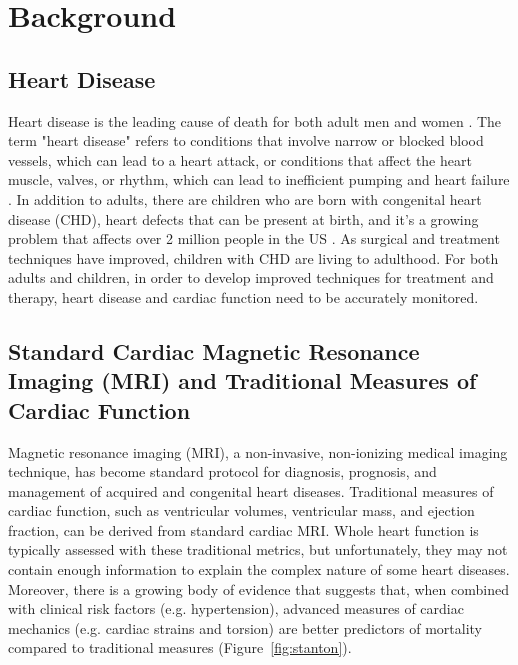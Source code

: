 \chapter{Background}

\section{Heart Disease}
	Heart disease is the leading cause of death for both adult men and women \cite{CDC2015}. The term "heart disease" refers to conditions that involve narrow or blocked blood vessels, which can lead to a heart attack, or conditions that affect the heart muscle, valves, or rhythm, which can lead to inefficient pumping and heart failure \cite{CDC2015}. In addition to adults, there are children who are born with congenital heart disease (CHD), heart defects that can be present at birth, and it's a growing problem that affects over 2 million people in the US \cite{Rosamond2007}. As surgical and treatment techniques have improved, children with CHD are living to adulthood. For both adults and children, in order to develop improved techniques for treatment and therapy, heart disease and cardiac function need to be accurately monitored.

\section{Standard Cardiac Magnetic Resonance Imaging (MRI) and Traditional Measures of Cardiac Function}
	Magnetic resonance imaging (MRI), a non-invasive, non-ionizing medical imaging technique, has become standard protocol for diagnosis, prognosis, and management of acquired and congenital heart diseases. Traditional measures of cardiac function, such as ventricular volumes, ventricular mass, and ejection fraction, can be derived from standard cardiac MRI. Whole heart function is typically assessed with these traditional metrics, but unfortunately, they may not contain enough information to explain the complex nature of some heart diseases. Moreover, there is a growing body of evidence that suggests that, when combined with clinical risk factors (e.g. hypertension), advanced measures of cardiac mechanics (e.g. cardiac strains and torsion) are better predictors of mortality compared to traditional measures \cite{Stanton2009} (Figure~\ref{fig:stanton}).

